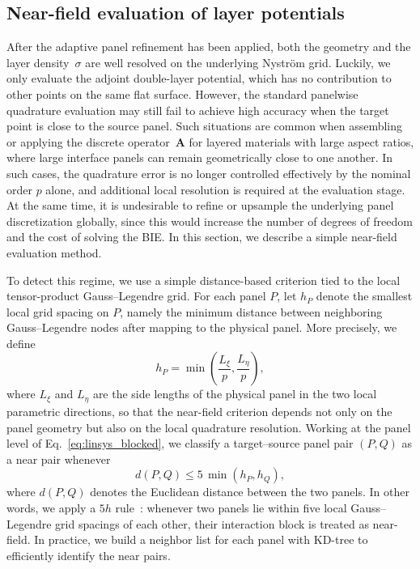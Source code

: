 \documentclass[preprint,12pt]{elsarticle}
\newcommand{\M}[1]{\boldsymbol{#1}}
\begin{document}
\subsection{Near-field evaluation of layer potentials}\label{sec:nearfield}

After the adaptive panel refinement has been applied, both the geometry and the layer density~$\sigma$ are well resolved on the underlying Nystr\"om grid.
Luckily, we only evaluate the adjoint double-layer potential, which has no contribution to other points on the same flat surface.
However, the standard panelwise quadrature evaluation may still fail to achieve high accuracy when the target point is close to the source panel.
Such situations are common when assembling or applying the discrete operator~$\M{A}$ for layered materials with large aspect ratios, where large interface panels can remain geometrically close to one another.
In such cases, the quadrature error is no longer controlled effectively by the nominal order $p$ alone, and additional local resolution is required at the evaluation stage.
At the same time, it is undesirable to refine or upsample the underlying panel discretization globally, since this would increase the number of degrees of freedom and the cost of solving the BIE.
In this section, we describe a simple near-field evaluation method.

To detect this regime, we use a simple distance-based criterion tied to the local tensor-product Gauss--Legendre grid.
For each panel $P$, let $h_P$ denote the smallest local grid spacing on $P$, namely the minimum distance between neighboring Gauss--Legendre nodes after mapping to the physical panel.
More precisely, we define
\begin{equation}
    h_P = \min \left(\frac{L_\xi}{p}, \frac{L_\eta}{p} \right),
\end{equation}
where $L_\xi$ and $L_\eta$ are the side lengths of the physical panel in the two local parametric directions,
so that the near-field criterion depends not only on the panel geometry but also on the local quadrature resolution.
Working at the panel level of Eq.~\eqref{eq:linsys_blocked}, we classify a target--source panel pair $(P,Q)$ as a near pair whenever
\begin{equation}\label{eq:5h_criterion}
    d(P,Q) \le 5\,\min(h_P,h_Q),
\end{equation}
where $d(P,Q)$ denotes the Euclidean distance between the two panels.
In other words, we apply a $5h$ rule~\cite{barnett2014evaluation}: whenever two panels lie within five local Gauss--Legendre grid spacings of each other, their interaction block is treated as near-field.
In practice, we build a neighbor list for each panel with KD-tree to efficiently identify the near pairs.
\end{document}
